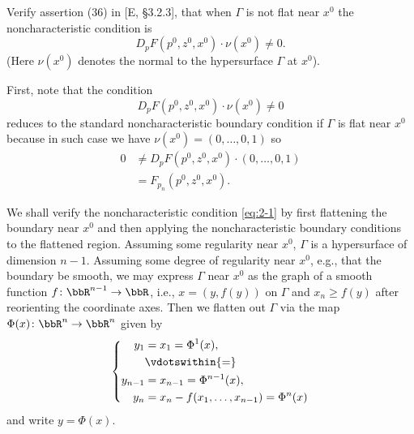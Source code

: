 \begin{problem}
  Verify assertion (36) in [E, \S 3.2.3], that when \(\Gamma\) is not flat
  near \(x^0\) the noncharacteristic condition is
  \[
    D_pF(p^0,z^0,x^0)\cdot \nu(x^0)\neq 0.
  \]
  (Here \(\nu(x^0)\) denotes the normal to the hypersurface \(\Gamma\) at
  \(x^0\)).
\end{problem}
\begin{solution}
  First, note that the condition
  \begin{equation}
    \label{eq:2-1}
    D_pF(p^0,z^0,x^0)\cdot \nu(x^0)\neq 0
  \end{equation}
  reduces to the standard noncharacteristic boundary condition if
  \(\Gamma\) is flat near \(x^0\) because in such case we have
  \(\nu(x^0)=(0,\dotsc,0,1)\) so
  \begin{align*}
    0&\neq D_pF(p^0,z^0,x^0)\cdot (0,\dotsc,0,1)\\
     &=F_{p_n}(p^0,z^0,x^0).
  \end{align*}

  We shall verify the noncharacteristic condition \eqref{eq:2-1} by first
  flattening the boundary near \(x^0\) and then applying the
  noncharacteristic boundary conditions to the flattened region. Assuming
  some regularity near \(x^0\), \(\Gamma\) is a hypersurface of dimension
  \(n-1\). Assuming some degree of regularity near \(x^0\), e.g., that the
  boundary be smooth, we may express \(\Gamma\) near \(x^0\) as the graph
  of a smooth function \(f\colon\bbR^{n-1}\to\bbR\), i.e., \(x=(y,f(y))\)
  on \(\Gamma\) and \(x_n\geq f(y)\) after reorienting the coordinate
  axes. Then we flatten out \(\Gamma\) via the map
  \(\Phi(x)\colon\bbR^n\to\bbR^n\) given by
  \[
    \left\{
      \begin{aligned}
        y_1&=x_1=\Phi^1(x),\\
        &\vdotswithin{=}\\
        y_{n-1}&=x_{n-1}=\Phi^{n-1}(x),\\
        y_n&=x_n-f(x_1,\dotsc,x_{n-1})=\Phi^n(x)
      \end{aligned}
    \right.
  \]
  and write \(y=\Phi(x)\).
\end{solution}
\newpage

